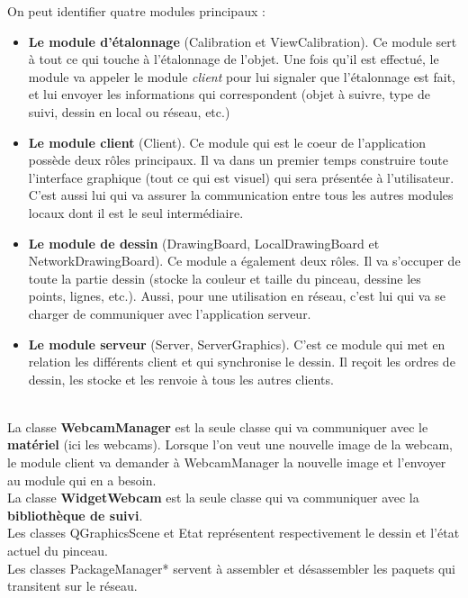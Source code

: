 \documentclass{report}
\begin{document}
				On peut identifier quatre modules principaux : \\
				\begin{itemize}
					\item \textbf{Le module d'étalonnage} (Calibration et ViewCalibration). Ce module sert à tout ce qui touche à l'étalonnage de l'objet. Une fois qu'il est effectué, le module va appeler le module \textit{client} pour lui signaler que l'étalonnage est fait, et lui envoyer les informations qui correspondent (objet à suivre, type de suivi, dessin en local ou réseau, etc.)
					\item \textbf{Le module client} (Client). Ce module qui est le coeur de l'application possède deux rôles principaux. Il va dans un premier temps construire toute l'interface graphique (tout ce qui est visuel) qui sera présentée à l'utilisateur. C'est aussi lui qui va assurer la communication entre tous les autres modules locaux dont il est le seul intermédiaire.
					\item \textbf{Le module de dessin} (DrawingBoard, LocalDrawingBoard et NetworkDrawingBoard). Ce module a également deux rôles. Il va s'occuper de toute la partie dessin (stocke la couleur et taille du pinceau, dessine les points, lignes, etc.). Aussi, pour une utilisation en réseau, c'est lui qui va se charger de communiquer avec l'application serveur.
					\item \textbf{Le module serveur} (Server, ServerGraphics). C'est ce module qui met en relation les différents client et qui synchronise le dessin. Il reçoit les ordres de dessin, les stocke et les renvoie à tous les autres clients.
				\end{itemize}
				\ \\
				La classe \textbf{WebcamManager} est la seule classe qui va communiquer avec le \textbf{matériel} (ici les webcams). Lorsque l'on veut une nouvelle image de la webcam, le module client va demander à WebcamManager la nouvelle image et l'envoyer au module qui en a besoin. \\
				La classe \textbf{WidgetWebcam} est la seule classe qui va communiquer avec la \textbf{bibliothèque de suivi}. \\
				Les classes QGraphicsScene et Etat représentent respectivement le dessin et l'état actuel du pinceau. \\
				Les classes PackageManager* servent à assembler et désassembler les paquets qui transitent sur le réseau.
				\newpage
\end{document}
